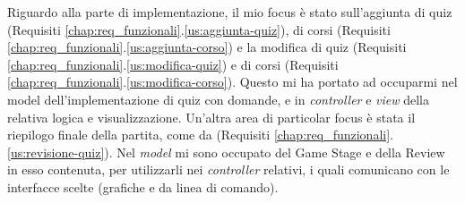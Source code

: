     Riguardo alla parte di implementazione, il mio focus è stato sull'aggiunta di quiz (Requisiti \ref{chap:req_funzionali}.\ref{us:aggiunta-quiz}), di corsi (Requisiti \ref{chap:req_funzionali}.\ref{us:aggiunta-corso}) e la modifica di quiz (Requisiti \ref{chap:req_funzionali}.\ref{us:modifica-quiz}) e di corsi (Requisiti \ref{chap:req_funzionali}.\ref{us:modifica-corso}). Questo mi ha portato ad occuparmi nel model dell'implementazione di quiz con domande, e in \textit{controller} e \textit{view} della relativa logica e visualizzazione. Un'altra area di particolar focus è stata il riepilogo finale della partita, come da (Requisiti \ref{chap:req_funzionali}.\ref{us:revisione-quiz}).  Nel \textit{model} mi sono occupato del Game Stage e della Review in esso contenuta, per utilizzarli nei \textit{controller} relativi, i quali comunicano con le interfacce scelte (grafiche e da linea di comando).

